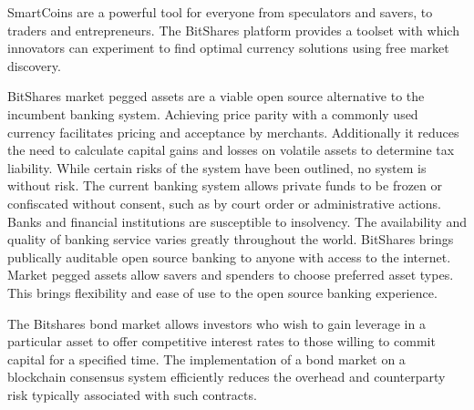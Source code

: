 
SmartCoins are a powerful tool for everyone from speculators and savers, to
traders and entrepreneurs. The BitShares platform provides a toolset with which
innovators can experiment to find optimal currency solutions using free market
discovery.

BitShares market pegged assets are a viable open source alternative to the
incumbent banking system. Achieving price parity with a commonly used currency
facilitates pricing and acceptance by merchants. Additionally it reduces the
need to calculate capital gains and losses on volatile assets to determine tax
liability. While certain risks of the system have been outlined, no system is
without risk. The current banking system allows private funds to be frozen or
confiscated without consent, such as by court order or administrative actions.
Banks and financial institutions are susceptible to insolvency. The
availability and quality of banking service varies greatly throughout the
world. BitShares brings publically auditable open source banking to anyone with
access to the internet. Market pegged assets allow savers and spenders to
choose preferred asset types. This brings flexibility and ease of use to the
open source banking experience.


The Bitshares bond market allows investors who wish to gain leverage in a
particular asset to offer competitive interest rates to those willing to commit
capital for a specified time. The implementation of a bond market on a
blockchain consensus system efficiently reduces the overhead and counterparty
risk typically associated with such contracts.
